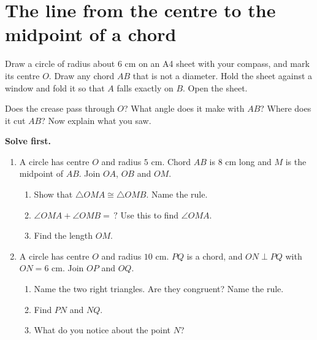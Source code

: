 \documentclass[11pt,a4paper]{article}
\theoremstyle{branddef}
\newcommand{\tr}{\triangle}
\newcounter{prob}
\newenvironment{solvefirst}
  {\par\smallskip\noindent\textbf{Solve first.}
   \begin{enumerate}[label=\textbf{P\arabic*.},leftmargin=2.2em,itemsep=3pt,start=\numexpr\value{prob}+1\relax]}
  {\setcounter{prob}{\value{enumi}}\end{enumerate}}
\newcommand{\ramark}[3]{\coordinate (ra1) at ($(#1)!2mm!(#2)$);\coordinate (ra2) at ($(#1)!2mm!(#3)$);\draw[thin] (ra1) -- ($(ra1)+(ra2)-(#1)$) -- (ra2);}
\begin{document}
\section{The line from the centre to the midpoint of a chord}

Draw a circle of radius about $6$ cm on an A4 sheet with your compass, and mark its centre $O$. Draw any chord $AB$ that is not a diameter. Hold the sheet against a window and fold it so that $A$ falls exactly on $B$. Open the sheet.

\begin{center}\end{center}

Does the crease pass through $O$? What angle does it make with $AB$? Where does it cut $AB$? Now explain what you saw.

\begin{solvefirst}
  \item A circle has centre $O$ and radius $5$ cm. Chord $AB$ is $8$ cm long and $M$ is the midpoint of $AB$. Join $OA$, $OB$ and $OM$.
  \begin{enumerate}[label=(\alph*),itemsep=1pt]
    \item Show that $\tr OMA\cong\tr OMB$. Name the rule.
    \item $\angle OMA+\angle OMB=\,?$ Use this to find $\angle OMA$.
    \item Find the length $OM$.
  \end{enumerate}
  \item A circle has centre $O$ and radius $10$ cm. $PQ$ is a chord, and $ON\perp PQ$ with $ON=6$ cm. Join $OP$ and $OQ$.
  \begin{enumerate}[label=(\alph*),itemsep=1pt]
    \item Name the two right triangles. Are they congruent? Name the rule.
    \item Find $PN$ and $NQ$.
    \item What do you notice about the point $N$?
  \end{enumerate}
\end{solvefirst}
\end{document}
